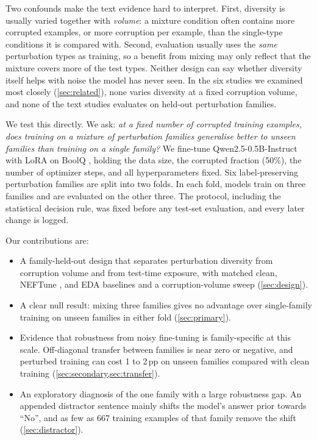 \documentclass[11pt]{article}
\newcommand{\ppts}{\,pp}
\begin{document}
Two confounds make the text evidence hard to interpret. First, diversity is usually varied together with \emph{volume}: a mixture condition often contains more corrupted examples, or more corruption per example, than the single-type conditions it is compared with. Second, evaluation usually uses the \emph{same} perturbation types as training, so a benefit from mixing may only reflect that the mixture covers more of the test types. Neither design can say whether diversity itself helps with noise the model has never seen. In the six studies we examined most closely (\cref{sec:related}), none varies diversity at a fixed corruption volume, and none of the text studies evaluates on held-out perturbation families.

We test this directly. We ask: \emph{at a fixed number of corrupted training examples, does training on a mixture of perturbation families generalise better to unseen families than training on a single family?} We fine-tune Qwen2.5-0.5B-Instruct \citep{qwen2025qwen25} with LoRA \citep{hu2022lora} on BoolQ \citep{clark2019boolq}, holding the data size, the corrupted fraction (50\%), the number of optimizer steps, and all hyperparameters fixed. Six label-preserving perturbation families are split into two folds. In each fold, models train on three families and are evaluated on the other three. The protocol, including the statistical decision rule, was fixed before any test-set evaluation, and every later change is logged.

Our contributions are:
\begin{itemize}
  \item A family-held-out design that separates perturbation diversity from corruption volume and from test-time exposure, with matched clean, NEFTune \citep{jain2024neftune}, and EDA \citep{wei2019eda} baselines and a corruption-volume sweep (\cref{sec:design}).
  \item A clear null result: mixing three families gives no advantage over single-family training on unseen families in either fold (\cref{sec:primary}).
  \item Evidence that robustness from noisy fine-tuning is family-specific at this scale. Off-diagonal transfer between families is near zero or negative, and perturbed training can cost 1 to 2\ppts{} on unseen families compared with clean training (\cref{sec:secondary,sec:transfer}).
  \item An exploratory diagnosis of the one family with a large robustness gap. An appended distractor sentence mainly shifts the model's answer prior towards ``No'', and as few as 667 training examples of that family remove the shift (\cref{sec:distractor}).
\end{itemize}
\end{document}
